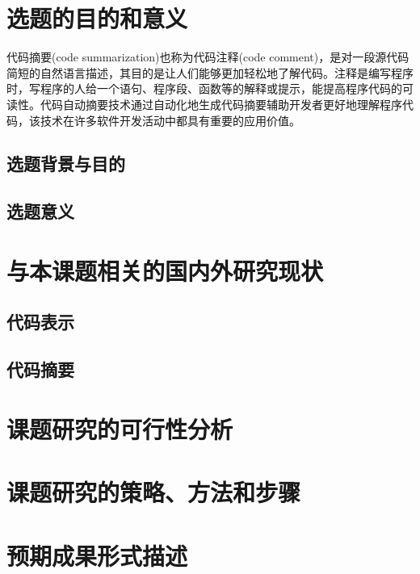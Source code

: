 \section{选题的目的和意义}
代码摘要(code summarization)也称为代码注释(code comment)，是对一段源代码简短的自然语言描述\cite{zsk}，其目的是让人们能够更加轻松地了解代码。注释是编写程序时，写程序的人给一个语句、程序段、函数等的解释或提示，能提高程序代码的可读性。代码自动摘要技术通过自动化地生成代码摘要辅助开发者更好地理解程序代码，该技术在许多软件开发活动中都具有重要的应用价值。

\subsection{选题背景与目的}
\subsection{选题意义}


\section{与本课题相关的国内外研究现状}
\subsection{代码表示}
\subsection{代码摘要}


\section{课题研究的可行性分析}


\section{课题研究的策略、方法和步骤}


\section{预期成果形式描述}


\nocite{*}%
